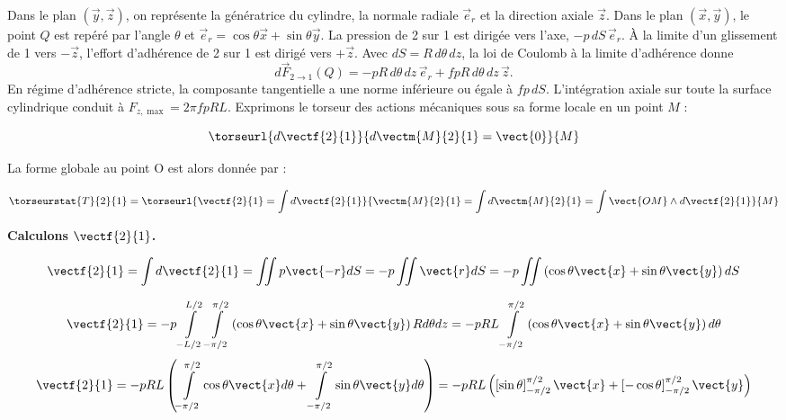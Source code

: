 \begin{corrigebox}
Dans le plan $(\vec y,\vec z)$, on représente la génératrice du cylindre,
            la normale radiale $\vec e_r$ et la direction axiale $\vec z$. Dans le plan
            $(\vec x,\vec y)$, le point $Q$ est repéré par l'angle $\theta$ et
            $\vec e_r=\cos\theta\vec x+\sin\theta\vec y$. La pression de 2 sur 1 est
            dirigée vers l'axe, $-p\,dS\,\vec e_r$. À la limite d'un glissement de 1 vers
            $-\vec z$, l'effort d'adhérence de 2 sur 1 est dirigé vers $+\vec z$.
Avec $dS=R\,d\theta\,dz$, la loi de Coulomb à la limite d'adhérence donne
            $$\boxed{d\vec F_{2\to1}(Q)=-pR\,d\theta\,dz\,\vec e_r
            +fpR\,d\theta\,dz\,\vec z}.$$
            En régime d'adhérence stricte, la composante tangentielle a une norme
            inférieure ou égale à $fp\,dS$. L'intégration axiale sur toute la surface
            cylindrique conduit à $F_{z,\max}=2\pi f pRL$.
Exprimons le torseur des actions mécaniques sous sa forme locale en un point $M$ : 

$$
\torseurl{d\vectf{2}{1}}{d\vectm{M}{2}{1}=\vect{0}}{M}
$$

La forme globale au point O est alors donnée par :

$$
\torseurstat{T}{2}{1} = \torseurl{\vectf{2}{1} = \int d\vectf{2}{1}}{\vectm{M}{2}{1} = \int d\vectm{M}{2}{1}= \int \vect{OM}\wedge d\vectf{2}{1}}{M}
$$

\vspace{.5cm}

\textbf{Calculons $\vectf{2}{1}$.}

$$
\vectf{2}{1} = \int d\vectf{2}{1} = \iint p \vect{-r} dS = -p \iint  \vect{r} dS
= -p \iint  \left(\cos\theta\vect{x}+\sin\theta\vect{y} \right) dS $$

$$
\vectf{2}{1}
= -p \int\limits_{-L/2}^{L/2} \int\limits_{-\pi/2}^{\pi/2}   \left(\cos\theta\vect{x}+\sin\theta\vect{y} \right) Rd\theta dz
= -p R L \int\limits_{-\pi/2}^{\pi/2}   \left(\cos\theta\vect{x}+\sin\theta\vect{y} \right) d\theta 
$$
$$
\vectf{2}{1}
= -p R L \left(\int\limits_{-\pi/2}^{\pi/2}   \cos\theta\vect{x}d\theta + \int\limits_{-\pi/2}^{\pi/2} \sin\theta\vect{y} d\theta \right)
= -p R L \left(\left[\sin\theta \right]_{-\pi/2}^{\pi/2}\vect{x}
+\left[ -\cos\theta\right]_{-\pi/2}^{\pi/2}\vect{y}
\right)
$$


\end{corrigebox}
